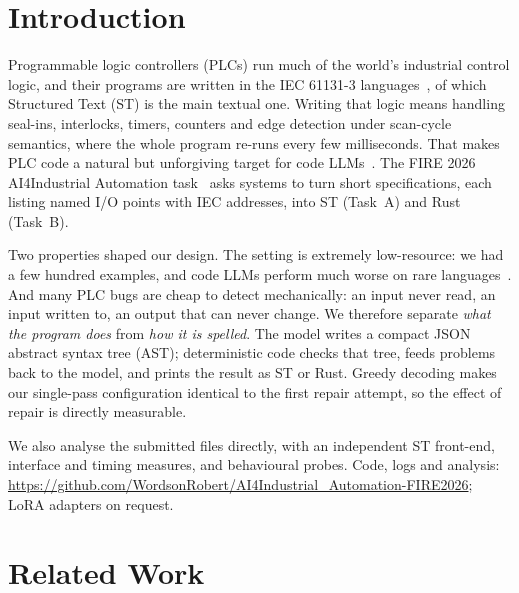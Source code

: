 \documentclass{ceurart}
\newcommand{\coderepo}{\url{https://github.com/WordsonRobert/AI4Industrial_Automation-FIRE2026}}
\begin{document}
\section{Introduction}

Programmable logic controllers (PLCs) run much of the world's industrial control logic, and their programs are written in the IEC 61131-3 languages~\cite{iec61131-3,john2010iec}, of which Structured Text (ST) is the main textual one. Writing that logic means handling seal-ins, interlocks, timers, counters and edge detection under scan-cycle semantics, where the whole program re-runs every few milliseconds. That makes PLC code a natural but unforgiving target for code LLMs~\cite{chen2021codex,austin2021mbpp,nijkamp2023codegen,li2023starcoder,roziere2023codellama,guo2024deepseekcoder,hui2024qwen25coder}. The FIRE 2026 AI4Industrial Automation task~\cite{fire2026nl2plc} asks systems to turn short specifications, each listing named I/O points with IEC addresses, into ST (Task~A) and Rust (Task~B).

Two properties shaped our design. The setting is extremely low-resource: we had a few hundred examples, and code LLMs perform much worse on rare languages~\cite{cassano2023multiple,cassano2024multiplt}. And many PLC bugs are cheap to detect mechanically: an input never read, an input written to, an output that can never change. We therefore separate \emph{what the program does} from \emph{how it is spelled}. The model writes a compact JSON abstract syntax tree (AST); deterministic code checks that tree, feeds problems back to the model, and prints the result as ST or Rust. Greedy decoding makes our single-pass configuration identical to the first repair attempt, so the effect of repair is directly measurable.

We also analyse the submitted files directly, with an independent ST front-end, interface and timing measures, and behavioural probes. Code, logs and analysis: \coderepo; LoRA adapters on request.

\section{Related Work}
\end{document}
